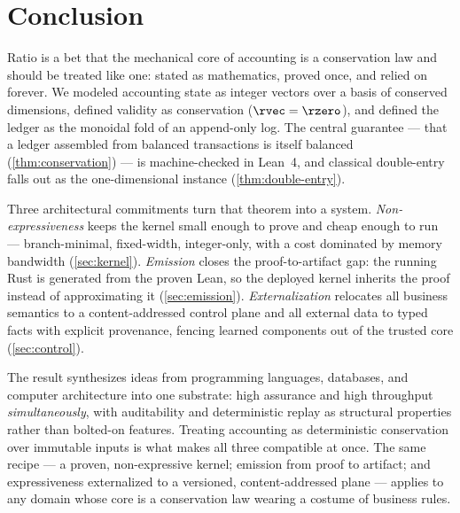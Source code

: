 \section{Conclusion}
\label{sec:conclusion}

Ratio is a bet that the mechanical core of accounting is a conservation
law and should be treated like one: stated as mathematics, proved once,
and relied on forever. We modeled accounting state as integer vectors
over a basis of conserved dimensions, defined validity as conservation
($\rvec = \rzero$), and defined the ledger as the monoidal fold of an
append-only log. The central guarantee --- that a ledger assembled from
balanced transactions is itself balanced (\cref{thm:conservation}) --- is
machine-checked in Lean~4, and classical double-entry falls out as the
one-dimensional instance (\cref{thm:double-entry}).

Three architectural commitments turn that theorem into a system.
\emph{Non-expressiveness} keeps the kernel small enough to prove and
cheap enough to run --- branch-minimal, fixed-width, integer-only, with a
cost dominated by memory bandwidth (\cref{sec:kernel}).
\emph{Emission} closes the proof-to-artifact gap: the running Rust is
generated from the proven Lean, so the deployed kernel inherits the proof
instead of approximating it (\cref{sec:emission}).
\emph{Externalization} relocates all business semantics to a
content-addressed control plane and all external data to typed facts with
explicit provenance, fencing learned components out of the trusted core
(\cref{sec:control}).

The result synthesizes ideas from programming languages, databases, and
computer architecture into one substrate: high assurance and high
throughput \emph{simultaneously}, with auditability and deterministic
replay as structural properties rather than bolted-on features. Treating
accounting as deterministic conservation over immutable inputs is what
makes all three compatible at once. The same recipe --- a proven,
non-expressive kernel; emission from proof to artifact; and expressiveness
externalized to a versioned, content-addressed plane --- applies to any
domain whose core is a conservation law wearing a costume of business
rules.
